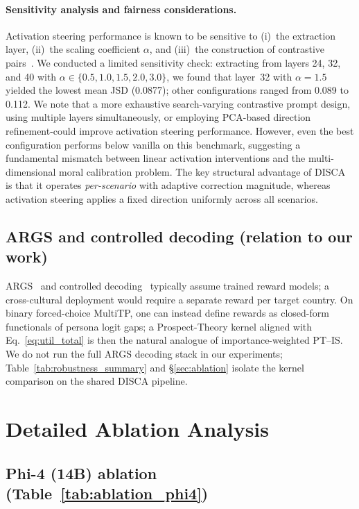 \documentclass{article}
\begin{document}
\paragraph{Sensitivity analysis and fairness considerations.}
Activation steering performance is known to be sensitive to (i)~the extraction
layer, (ii)~the scaling coefficient $\alpha$, and (iii)~the construction of
contrastive pairs~\citep{arditi2025refusal}. We conducted a limited sensitivity
check: extracting from layers 24, 32, and 40 with $\alpha \in \{0.5, 1.0, 1.5,
2.0, 3.0\}$, we found that layer~32 with $\alpha=1.5$ yielded the lowest mean
JSD (0.0877); other configurations ranged from 0.089 to 0.112. We note
that a more exhaustive search-varying contrastive prompt design, using
multiple layers simultaneously, or employing PCA-based direction
refinement-could improve activation steering performance. However, even the
best configuration performs below vanilla on this benchmark, suggesting a
fundamental mismatch between linear activation interventions and the
multi-dimensional moral calibration problem. The key structural advantage of
DISCA is that it operates \emph{per-scenario} with adaptive correction
magnitude, whereas activation steering applies a fixed direction uniformly
across all scenarios.

\subsection{ARGS and controlled decoding (relation to our work)}
ARGS~\citep{khanov2024args} and controlled decoding~\citep{mudgal2024controlled}
typically assume trained reward models; a cross-cultural deployment would require a
separate reward per target country. On binary forced-choice MultiTP, one can instead
define rewards as closed-form functionals of persona logit gaps; a Prospect-Theory
kernel aligned with Eq.~\ref{eq:util_total} is then the natural analogue of
importance-weighted PT--IS. We do not run the full ARGS decoding stack in our
experiments; Table~\ref{tab:robustness_summary} and \S\ref{sec:ablation} isolate the
kernel comparison on the shared DISCA pipeline.

\section{Detailed Ablation Analysis}
\label{app:ablation_detail}

\subsection*{Phi-4 (14B) ablation (Table~\ref{tab:ablation_phi4})}
\end{document}
